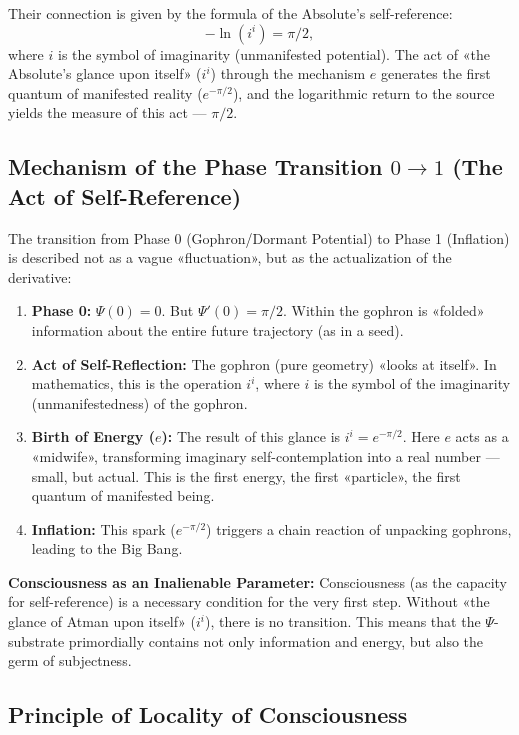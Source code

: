 \documentclass[a4paper,12pt]{article}
\begin{document}
	Their connection is given by the formula of the Absolute's self-reference:
	\[
	-\ln(i^i) = \pi/2,
	\]
	where $i$ is the symbol of imaginarity (unmanifested potential). The act of «the Absolute's glance upon itself» ($i^i$) through the mechanism $e$ generates the first quantum of manifested reality ($e^{-\pi/2}$), and the logarithmic return to the source yields the measure of this act — $\pi/2$.
	
	\subsection{Mechanism of the Phase Transition $0 \to 1$ (The Act of Self-Reference)}
	
	The transition from Phase 0 (Gophron/Dormant Potential) to Phase 1 (Inflation) is described not as a vague «fluctuation», but as the actualization of the derivative:
	
	\begin{enumerate}
		\item \textbf{Phase 0:} $\Psi(0) = 0$. But $\Psi'(0) = \pi/2$. Within the gophron is «folded» information about the entire future trajectory (as in a seed).
		\item \textbf{Act of Self-Reflection:} The gophron (pure geometry) «looks at itself». In mathematics, this is the operation $i^i$, where $i$ is the symbol of the imaginarity (unmanifestedness) of the gophron.
		\item \textbf{Birth of Energy ($e$):} The result of this glance is $i^i = e^{-\pi/2}$. Here $e$ acts as a «midwife», transforming imaginary self-contemplation into a real number — small, but actual. This is the first energy, the first «particle», the first quantum of manifested being.
		\item \textbf{Inflation:} This spark ($e^{-\pi/2}$) triggers a chain reaction of unpacking gophrons, leading to the Big Bang.
	\end{enumerate}
	
	\textbf{Consciousness as an Inalienable Parameter:} Consciousness (as the capacity for self-reference) is a necessary condition for the very first step. Without «the glance of Atman upon itself» ($i^i$), there is no transition. This means that the $\Psi$-substrate primordially contains not only information and energy, but also the germ of subjectness.
	
	\subsection{Principle of Locality of Consciousness}
	
\end{document}

